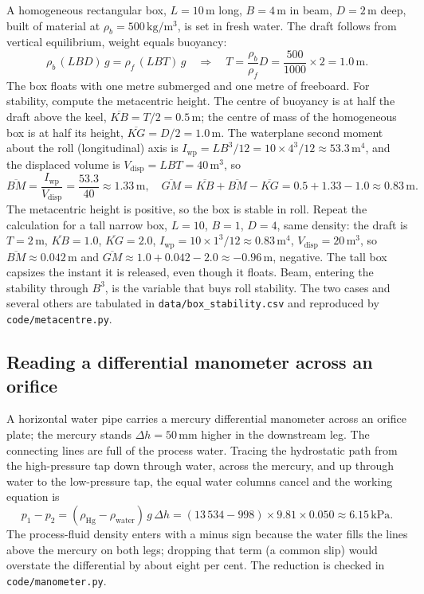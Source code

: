 A homogeneous rectangular box, $L = 10\,\si{\meter}$ long, $B = 4\,\si{
\meter}$ in beam, $D = 2\,\si{\meter}$ deep, built of material at
$\rho_b = 500\,\si{\kilogram\per\meter\cubed}$, is set in fresh water.
The draft follows from vertical equilibrium, weight equals buoyancy:
\[
\rho_b\, (LBD)\, g = \rho_f\, (LBT)\, g
\quad\Rightarrow\quad
T = \frac{\rho_b}{\rho_f} D = \frac{500}{1000} \times 2 = 1.0\,\si{\meter}.
\]
The box floats with one metre submerged and one metre of freeboard. For
stability, compute the metacentric height. The centre of buoyancy is at
half the draft above the keel, $\overline{KB} = T/2 = 0.5\,\si{\meter}$;
the centre of mass of the homogeneous box is at half its height,
$\overline{KG} = D/2 = 1.0\,\si{\meter}$. The waterplane second moment
about the roll (longitudinal) axis is $I_{\text{wp}} = L B^3 / 12 =
10 \times 4^3 / 12 \approx 53.3\,\text{m}^4$, and the displaced volume
is $V_{\text{disp}} = LBT = 40\,\text{m}^3$, so
\[
\overline{BM} = \frac{I_{\text{wp}}}{V_{\text{disp}}}
= \frac{53.3}{40} \approx 1.33\,\si{\meter},
\quad
\overline{GM} = \overline{KB} + \overline{BM} - \overline{KG}
= 0.5 + 1.33 - 1.0 \approx 0.83\,\si{\meter}.
\]
The metacentric height is positive, so the box is stable in roll. Repeat
the calculation for a tall narrow box, $L = 10$, $B = 1$, $D = 4$,
same density: the draft is $T = 2\,\si{\meter}$, $\overline{KB} = 1.0$,
$\overline{KG} = 2.0$, $I_{\text{wp}} = 10 \times 1^3/12 \approx 0.83\,
\text{m}^4$, $V_{\text{disp}} = 20\,\text{m}^3$, so $\overline{BM}
\approx 0.042\,\si{\meter}$ and $\overline{GM} \approx 1.0 + 0.042 -
2.0 \approx -0.96\,\si{\meter}$, negative. The tall box capsizes the
instant it is released, even though it floats. Beam, entering the
stability through $B^3$, is the variable that buys roll stability. The
two cases and several others are tabulated in
\texttt{data/box\_stability.csv} and reproduced by
\texttt{code/metacentre.py}.

\subsection{Reading a differential manometer across an orifice}

A horizontal water pipe carries a mercury differential manometer across
an orifice plate; the mercury stands $\Delta h = 50\,\si{\milli\meter}$
higher in the downstream leg. The connecting lines are full of the
process water. Tracing the hydrostatic path from the high-pressure tap
down through water, across the mercury, and up through water to the
low-pressure tap, the equal water columns cancel and the working
equation is
\[
p_1 - p_2 = (\rho_{\text{Hg}} - \rho_{\text{water}})\, g\, \Delta h
= (13\,534 - 998) \times 9.81 \times 0.050
\approx 6.15\,\text{kPa}.
\]
The process-fluid density enters with a minus sign because the water
fills the lines above the mercury on both legs; dropping that term (a
common slip) would overstate the differential by about eight per cent.
The reduction is checked in \texttt{code/manometer.py}.

